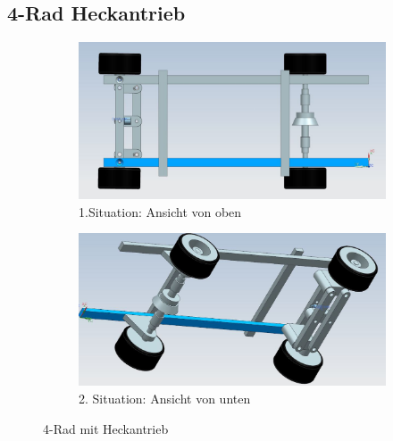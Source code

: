 \pagebreak


\subsection{4-Rad Heckantrieb}

\begin{figure} [hbp]
	\centering
	\begin{subfigure}[b]{0.4\textwidth}
		\includegraphics[width=\textwidth]{fig/4Rad-1.JPG}
		\caption{1.Situation: Ansicht von oben}
	\end{subfigure}
	\hfill
	\begin{subfigure}[b]{0.36\textwidth}
		\includegraphics[width=\textwidth]{fig/4Rad-2.JPG}
		\caption{2. Situation: Ansicht von unten}
\end{subfigure}
	\caption{4-Rad mit Heckantrieb}\label{fig:animals}
\end{figure}

